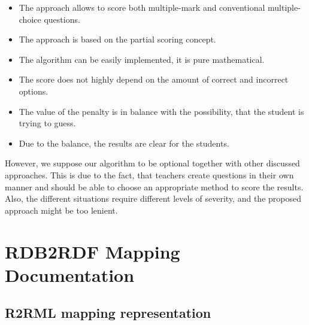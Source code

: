 \begin{itemize}
  \item The approach allows to score both multiple-mark and conventional multiple-choice questions.
  \item The approach is based on the partial scoring concept.
  \item The algorithm can be easily implemented, it is pure mathematical.
  \item The score does not highly depend on the amount of correct and incorrect options.
  \item The value of the penalty is in balance with the possibility, that the student is trying to guess.
  \item Due to the balance, the results are clear for the students.  
\end{itemize}

However, we suppose our algorithm to be optional together with other discussed approaches.
This is due to the fact, that teachers create questions in their own manner and should be able to choose an appropriate method to score the results.
Also, the different situations require different levels of 	
severity, and the proposed approach might be too lenient.




\chapter{RDB2RDF Mapping Documentation}
\label{sec:app1}
\section{R2RML mapping representation}
\label{app1:r2rml}

